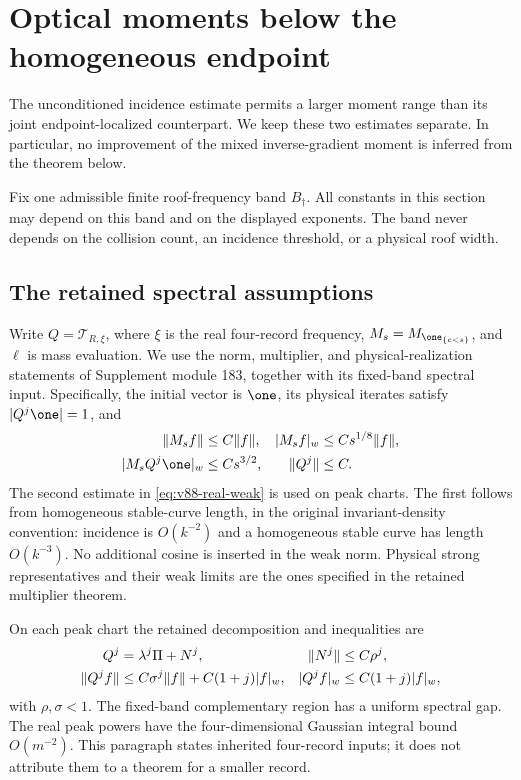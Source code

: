 \section{Optical moments below the homogeneous endpoint}
\label{sec:v88-moments}
The unconditioned incidence estimate permits a larger moment range than
its joint endpoint-localized counterpart. We keep these two estimates
separate. In particular, no improvement of the mixed inverse-gradient
moment is inferred from the theorem below.

Fix one admissible finite roof-frequency band $B_\dagger$. All constants
in this section may depend on this band and on the displayed exponents.
The band never depends on the collision count, an incidence threshold,
or a physical roof width.

\subsection{The retained spectral assumptions}
Write $Q=\mathscr T_{R,\xi}$, where $\xi$ is the real four-record
frequency, $M_s=M_{\one_{\{c<s\}}}$, and $\ell$ is mass evaluation.
We use the norm, multiplier, and physical-realization statements of
Supplement module 183, together with its fixed-band spectral input.
Specifically, the initial vector is $\one$, its physical iterates satisfy
$|Q^j\one|=1$, and
\begin{align}
 \|M_s f\|&\le C\|f\|,& |M_s f|_w&\le Cs^{1/8}\|f\|,
                                                    \label{eq:v88-multiplier}\\
 |M_sQ^j\one|_w&\le Cs^{3/2},&\|Q^j\|&\le C.
                                                    \label{eq:v88-real-weak}
\end{align}
The second estimate in \eqref{eq:v88-real-weak} is used on peak
charts. The first follows from homogeneous stable-curve length, in the
original invariant-density convention: incidence is $O(k^{-2})$ and
a homogeneous stable curve has length $O(k^{-3})$. No additional cosine
is inserted in the weak norm. Physical strong representatives and their
weak limits are the ones specified in the retained multiplier theorem.

On each peak chart the retained decomposition and inequalities are
\begin{align}
 Q^j&=\lambda^j\Pi+N^j,&\|N^j\|&\le C\rho^j,\notag\\
 \|Q^j f\|&\le C\sigma^j\|f\|+C(1+j)|f|_w,&
 |Q^j f|_w&\le C(1+j)|f|_w,                   \label{eq:v88-spectral}
\end{align}
with $\rho,\sigma<1$. The fixed-band complementary region has a
uniform spectral gap. The real peak powers have the four-dimensional
Gaussian integral bound $O(m^{-2})$. This paragraph states inherited
four-record inputs; it does not attribute them to a theorem for a
smaller record.

